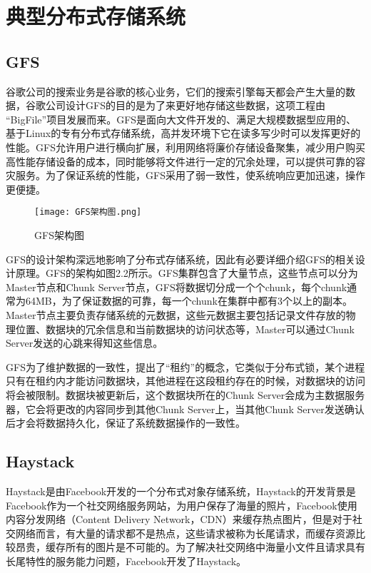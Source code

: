 \section{典型分布式存储系统}%
\subsection{GFS}%
谷歌公司的搜索业务是谷歌的核心业务，它们的搜索引擎每天都会产生大量的数据，谷歌公司设计GFS的目的是为了来更好地存储这些数据，这项工程由 “BigFile”项目发展而来。GFS是面向大文件开发的、满足大规模数据型应用的、基于Linux的专有分布式存储系统，高并发环境下它在读多写少时可以发挥更好的性能。GFS允许用户进行横向扩展，利用网络将廉价存储设备聚集，减少用户购买高性能存储设备的成本，同时能够将文件进行一定的冗余处理，可以提供可靠的容灾服务。为了保证系统的性能，GFS采用了弱一致性，使系统响应更加迅速，操作更便捷。

\begin{figure}
    \centering
    \texttt{[image: GFS架构图.png]}
    \caption{GFS架构图}
\end{figure}
GFS的设计架构深远地影响了分布式存储系统，因此有必要详细介绍GFS的相关设计原理。GFS的架构如图2.2所示。GFS集群包含了大量节点，这些节点可以分为Master节点和Chunk Server节点，GFS将数据切分成一个个chunk，每个chunk通常为64MB，为了保证数据的可靠，每一个chunk在集群中都有3个以上的副本\cite{26}。Master节点主要负责存储系统的元数据，这些元数据主要包括记录文件存放的物理位置、数据块的冗余信息和当前数据块的访问状态等，Master可以通过Chunk Server发送的心跳来得知这些信息。

GFS为了维护数据的一致性，提出了“租约”的概念，它类似于分布式锁，某个进程只有在租约内才能访问数据块，其他进程在这段租约存在的时候，对数据块的访问将会被限制。数据块被更新后，这个数据块所在的Chunk Server会成为主数据服务器，它会将更改的内容同步到其他Chunk Server上，当其他Chunk Server发送确认后才会将数据持久化，保证了系统数据操作的一致性。


\subsection{Haystack}%
Haystack是由Facebook开发的一个分布式对象存储系统，Haystack的开发背景是Facebook作为一个社交网络服务网站，为用户保存了海量的照片，Facebook使用内容分发网络（Content Delivery Network，CDN）来缓存热点图片，但是对于社交网络而言，有大量的请求都不是热点，这些请求被称为长尾请求，而缓存资源比较昂贵，缓存所有的图片是不可能的。为了解决社交网络中海量小文件且请求具有长尾特性的服务能力问题，Facebook开发了Haystack。

